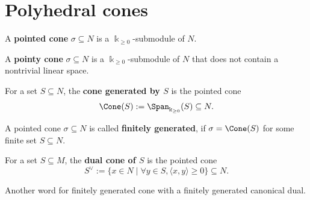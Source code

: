 \section{Polyhedral cones}

\begin{definition}
  \label{pointed-cone}
  \uses{}
  A {\bf pointed cone} \( \sigma \subseteq N \) is a \( \Bbbk_{\geq 0}
  \)-submodule of \( N \).
\end{definition}

\begin{definition}
  \label{pointy-cone}
  A {\bf pointy cone} \( \sigma \subseteq N \) is a \( \Bbbk_{\geq 0}
  \)-submodule of \( N \) that does not contain a nontrivial linear space.
\end{definition}

\begin{definition}
  \label{cone-span}
  For a set \( S \subseteq N \), the {\bf cone generated by \( S \)}
  is the pointed cone
  \[
      \Cone(S) := \Span_{\Bbbk_{\geq 0}}(S) \subseteq N.
  \]
\end{definition}

\begin{definition}
  \label{cone-finitely-generated}
  A pointed cone \( \sigma \subseteq N \) is called {\bf finitely
  generated}, if \( \sigma = \Cone(S) \) for some finite set \( S
  \subseteq N \).
\end{definition}

\begin{definition}
  \label{dual-cone}
  For a set \( S \subseteq M \), the {\bf dual cone of \( S \)} is
  the pointed cone
  \[
      S^\vee := \{x \in N \mid \forall y \in S, \langle x, y \rangle
      \geq 0 \} \subseteq N.
  \]
\end{definition}

\begin{definition}
  \label{polyhedral-cone}
  Another word for finitely generated cone with a finitely generated canonical dual.
\end{definition}

